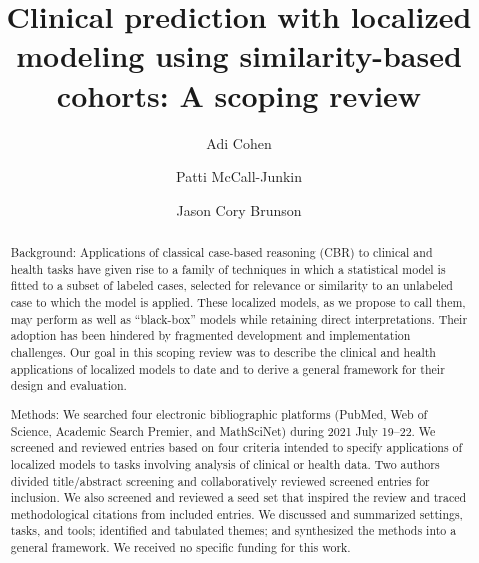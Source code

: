 \documentclass[preprint, 3p,
authoryear]{elsarticle} %
\begin{document}
\begin{frontmatter}

  \title{Clinical prediction with localized modeling using
similarity-based cohorts: A scoping review}
    \author[1]{Adi Cohen%
  }
    \author[2]{Patti McCall-Junkin%
  }
    \author[3]{Jason Cory Brunson%
  }
  
  \begin{abstract}
  Background: Applications of classical case-based reasoning (CBR) to
  clinical and health tasks have given rise to a family of techniques in
  which a statistical model is fitted to a subset of labeled cases,
  selected for relevance or similarity to an unlabeled case to which the
  model is applied. These localized models, as we propose to call them,
  may perform as well as ``black-box'' models while retaining direct
  interpretations. Their adoption has been hindered by fragmented
  development and implementation challenges. Our goal in this scoping
  review was to describe the clinical and health applications of
  localized models to date and to derive a general framework for their
  design and evaluation.

  Methods: We searched four electronic bibliographic platforms (PubMed,
  Web of Science, Academic Search Premier, and MathSciNet) during 2021
  July 19--22. We screened and reviewed entries based on four criteria
  intended to specify applications of localized models to tasks
  involving analysis of clinical or health data. Two authors divided
  title/abstract screening and collaboratively reviewed screened entries
  for inclusion. We also screened and reviewed a seed set that inspired
  the review and traced methodological citations from included entries.
  We discussed and summarized settings, tasks, and tools; identified and
  tabulated themes; and synthesized the methods into a general
  framework. We received no specific funding for this work.


\end{abstract}
\end{frontmatter}
\end{document}
